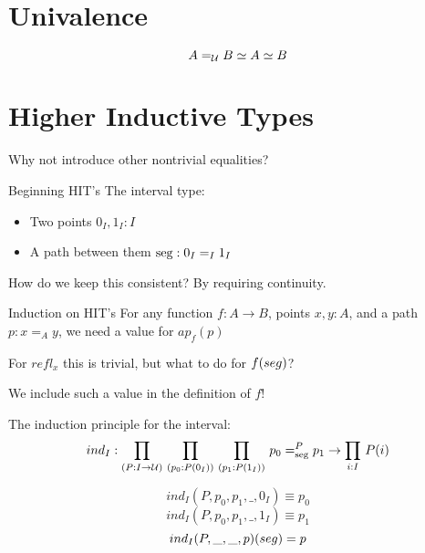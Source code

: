 \documentclass[xcolor=svgnames]{beamer}
\begin{document}
\section{Univalence}

\begin{frame}
  \begin{center}
  \end{center}
\end{frame}

\begin{frame}
   $$ \eqv{\id[\type]{A}{B}}{\eqv{A}{B}} $$


\end{frame}

\section{Higher Inductive Types}

\begin{frame}
  \begin{center}
    \Huge Why not introduce other nontrivial equalities?
  \end{center}
\end{frame}

\begin{frame}{Beginning HIT's}
  The interval type:
  \begin{itemize}
  \item Two points $0_I,1_I : I$
  \item A path between them $\mathrm{seg} : \id[I]{0_I}{1_I}$
  \end{itemize} \pause

  How do we keep this consistent? \pause By requiring continuity.
\end{frame}

\begin{frame}{Induction on HIT's}
  For any function $f : A \to B$, points $x,y : A$, and a path $p : x =_A y$,
  we need a value for $ap_f(p)$

  For $refl_x$ this is trivial, but what to do for $\map{f}{seg}$? \pause

  We include such a value in the definition of $f$!

  The induction principle for the interval:
  $$
  ind_I : \prd{P : I \to \type}{p_0 : P(0_I)}{p_1 : P(1_I)}
  p_0 =^P_{\mathrm{seg}} p_1 \to \prd{i : I} P(i)
  $$

  $$ ind_I(P,p_0,p_1,\_,0_I) \equiv p_0 $$
  $$ ind_I(P,p_0,p_1,\_,1_I) \equiv p_1 $$
  $$ \map{ind_I(P,\_,\_,p)}{seg} = p $$
\end{frame}
\end{document}
